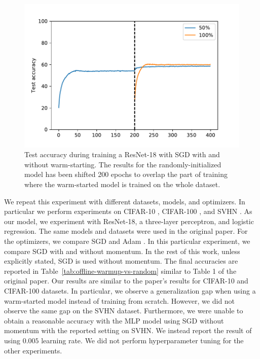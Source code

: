 \begin{figure}
    \includegraphics[width=\linewidth]{figures/fig1_test_accuracy.pdf}
    \caption{Test accuracy during training a ResNet-18 with SGD with and without warm-starting. The results for the randomly-initialized model has been shifted 200 epochs to overlap the part of training where the warm-started model is trained on the whole dataset. }
    \label{fig:offline-warmup-vs-random-CIFAR-10}
\end{figure}

We repeat this experiment with different datasets, models, and optimizers. In particular we perform experiments on CIFAR-10 \cite{hinton_learning_2007}, CIFAR-100 \cite{hinton_learning_2007}, and SVHN \cite{svhn}. As our model, we experiment with ResNet-18, a three-layer perceptron, and logistic regression. The same models and datasets were used in the original paper. For the optimizers, we compare SGD \cite{rumelhart_learning_1986} and Adam \cite{kingma_adam:_2015}. In this particular experiment, we compare SGD with and without momentum. In the rest of this work, unless explicitly stated, SGD is used without momentum. 
The final accuracies are reported in Table~\ref{tab:offline-warmup-vs-random} similar to Table 1 of the original paper. Our results are similar to the paper's results for CIFAR-10 and CIFAR-100 datasets. In particular, we observe a generalization gap when using a warm-started model instead of training from scratch. However, we did not observe the same gap on the SVHN dataset.  Furthermore, we were unable to obtain a reasonable accuracy with the MLP model using SGD without momentum with the reported setting on SVHN. We instead report the result of using $0.005$ learning rate. We did not perform hyperparameter tuning for the other experiments.

